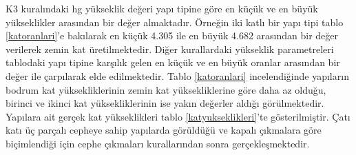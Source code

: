 \documentclass[12pt,turkish,a4paperpaper,]{report}
\begin{document}
K3 kuralındaki hg yükseklik değeri yapı tipine göre en küçük ve en büyük
yükseklikler arasından bir değer almaktadır. Örneğin iki katlı bir yapı
tipi tablo \ref{katoranlari}'e bakılarak en küçük 4.305 ile en büyük
4.682 arasından bir değer verilerek zemin kat üretilmektedir. Diğer
kurallardaki yükseklik parametreleri tablodaki yapı tipine karşılık
gelen en küçük ve en büyük oranlar arasından bir değer ile çarpılarak
elde edilmektedir. Tablo \ref{katoranlari} incelendiğinde yapıların
bodrum kat yüksekliklerinin zemin kat yüksekliklerine göre daha az
olduğu, birinci ve ikinci kat yüksekliklerinin ise yakın değerler aldığı
görülmektedir. Yapılara ait gerçek kat yükseklikleri tablo
\ref{katyukseklikleri}'te gösterilmiştir. Çatı katı üç parçalı cepheye
sahip yapılarda görüldüğü ve kapalı çıkmalara göre biçimlendiği için
cephe çıkmaları kurallarından sonra gerçekleşmektedir.
\end{document}
